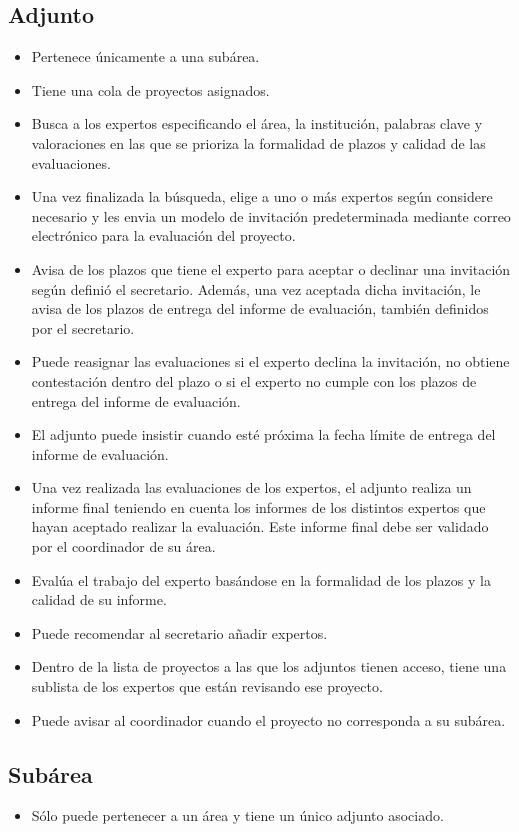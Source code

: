 \documentclass[12pt,a4paper,spanish,twoside]{book}
\begin{document}
\subsection{Adjunto}
\begin{itemize}
\item Pertenece únicamente a una subárea.
\item Tiene una cola de proyectos asignados.
\item Busca a los expertos especificando el área, la institución, palabras
  clave y valoraciones en las que se prioriza la formalidad de plazos y
  calidad de las evaluaciones. 
\item Una vez finalizada la búsqueda, elige a uno o más expertos según
  considere necesario y les envia un modelo de invitación predeterminada
  mediante correo electrónico para la  evaluación del proyecto.  
\item Avisa de los plazos que tiene el experto para aceptar o declinar una
  invitación según definió el secretario. Además, una vez aceptada dicha
  invitación, le avisa de los plazos de entrega del informe de evaluación,
  también definidos por el secretario. 
\item Puede reasignar las evaluaciones si el experto declina la invitación,
  no obtiene contestación dentro del plazo o si el experto no cumple con los
  plazos de entrega del informe de evaluación.
\item El adjunto puede insistir cuando esté próxima la fecha límite de
  entrega del informe de evaluación. 
\item Una vez realizada las evaluaciones de los expertos, el adjunto
  realiza un informe final teniendo en cuenta los informes de los distintos
  expertos que hayan aceptado realizar la evaluación. Este informe final
  debe ser validado por el coordinador de su área. 
\item Evalúa el trabajo del experto basándose en la formalidad de los plazos
  y la calidad de su informe. 
\item Puede recomendar al secretario añadir expertos.
\item Dentro de la lista de proyectos a las que los adjuntos tienen acceso,
  tiene una sublista de los expertos que están revisando ese proyecto. 
\item Puede avisar al coordinador cuando el proyecto no corresponda a su
  subárea. 
\end{itemize}

\subsection{Subárea}
\begin{itemize}
\item Sólo puede pertenecer a un área y tiene un único adjunto asociado.
\end{itemize}
\end{document}
